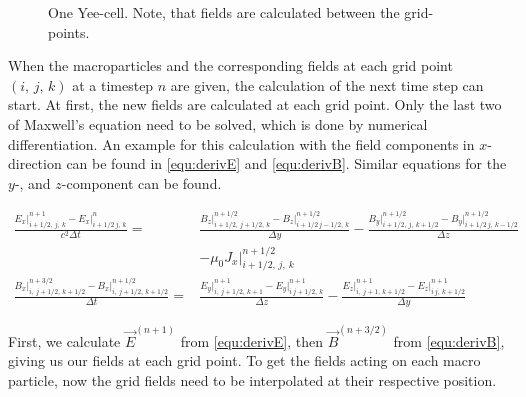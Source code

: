 \documentclass[bachelor_thesis]{subfiles}
\begin{document}
\begin{figure}
	\centering
	\missingfigure{}
	\caption{One Yee-cell. Note, that fields are calculated between the grid-points.}
	\label{fig:cell}
\end{figure}

When the macroparticles and the corresponding fields at each grid point $(i, \, j, \,k)$ at a timestep $n$ are given, the calculation of the next time step can start.
At first, the new fields are calculated at each grid point. Only the last two of Maxwell's equation need to be solved, which is done by numerical differentiation. 
An example for this calculation with the field components in $x$-direction can be found in \autoref{equ:derivE} and \autoref{equ:derivB}. Similar equations for the $y$-, and $z$-component can be found.

\begin{align}
	\frac{{E}_x\rvert_{i+1/2,\, j,\, k}^{n+1} - {E}_x\rvert_{i+1/2\, j,\, k}^{n}}{c^2\Delta t}
	=& \frac{{B}_z\rvert_{i+1/2,\, j+1/2,\, k}^{n+1/2} - {B}_z\rvert_{i+1/2\, j-1/2,\, k}^{n+1/2}}{\Delta y}
	- \frac{{B}_y\rvert_{i+1/2,\, j,\, k+1/2}^{n+1/2} - {B}_y\rvert_{i+1/2\, j,\, k-1/2}^{n+1/2}}{\Delta z}
	\label{equ:derivE}	\\&
	-\mu_0 J_x \rvert_{i+1/2,\, j,\, k}^{n+1/2}											\nonumber	\\
	 \frac{{B}_x\rvert_{i,\, j+1/2,\, k+1/2}^{n+3/2} - {B}_x\rvert_{i,\, j+1/2,\, k+1/2}^{n+1/2}}{\Delta t} 
	 =& \frac{{E}_y\rvert_{i,\, j+1/2,\, k+1}^{n+1} - {E}_y\rvert_{i\, j+1/2,\, k}^{n+1}}{\Delta z}
	- \frac{{E}_z\rvert_{i,\, j+1,\, k+1/2}^{n+1} - {E}_z\rvert_{i\, j,\, k+1/2}^{n+1}}{\Delta y}
	\label{equ:derivB}
\end{align} 

First, we calculate $\vec{E}^{(n+1)}$ from \autoref{equ:derivE}, then $\vec{B}^{(n+3/2)}$ from \autoref{equ:derivB}, giving us our fields at each grid point.
To get the fields acting on each macro particle, now the grid fields need to be interpolated at their respective position. 
\end{document}
